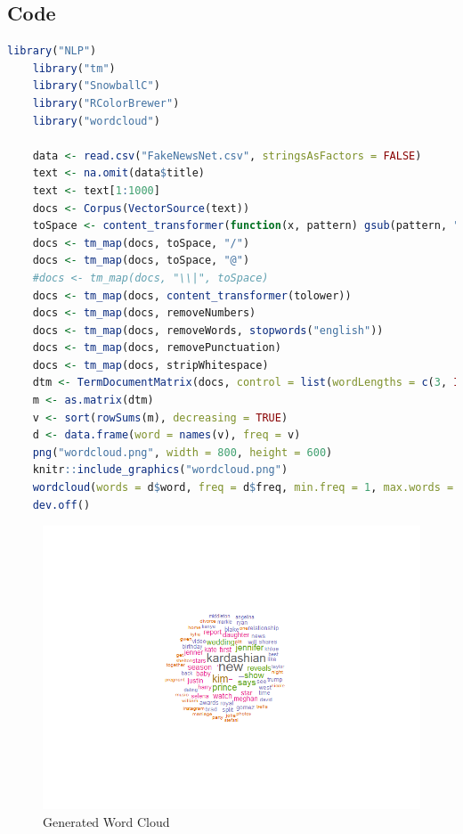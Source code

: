 \documentclass[12pt]{article}
\begin{document}
	\subsection*{Code}
	\begin{lstlisting}[language=R]
	library("NLP")
	library("tm")
	library("SnowballC")
	library("RColorBrewer")
	library("wordcloud")
	
	data <- read.csv("FakeNewsNet.csv", stringsAsFactors = FALSE)
	text <- na.omit(data$title)
	text <- text[1:1000]
	docs <- Corpus(VectorSource(text))
	toSpace <- content_transformer(function(x, pattern) gsub(pattern, " ", x))
	docs <- tm_map(docs, toSpace, "/")
	docs <- tm_map(docs, toSpace, "@")
	#docs <- tm_map(docs, "\\|", toSpace)
	docs <- tm_map(docs, content_transformer(tolower))
	docs <- tm_map(docs, removeNumbers)
	docs <- tm_map(docs, removeWords, stopwords("english"))
	docs <- tm_map(docs, removePunctuation)
	docs <- tm_map(docs, stripWhitespace)
	dtm <- TermDocumentMatrix(docs, control = list(wordLengths = c(3, Inf)))
	m <- as.matrix(dtm)
	v <- sort(rowSums(m), decreasing = TRUE)
	d <- data.frame(word = names(v), freq = v)
	png("wordcloud.png", width = 800, height = 600)
	knitr::include_graphics("wordcloud.png")
	wordcloud(words = d$word, freq = d$freq, min.freq = 1, max.words = 75, random.order = FALSE, rot.per = 0, scale = c(2.4, 0.35), colors = brewer.pal(8, "Dark2"))
	dev.off()
	\end{lstlisting}
	
	\begin{figure}[H]
		\centering
		\includegraphics[width=\textwidth, keepaspectratio]{wordcloud.png}
		\caption{Generated Word Cloud}
	\end{figure}
	
\end{document}
